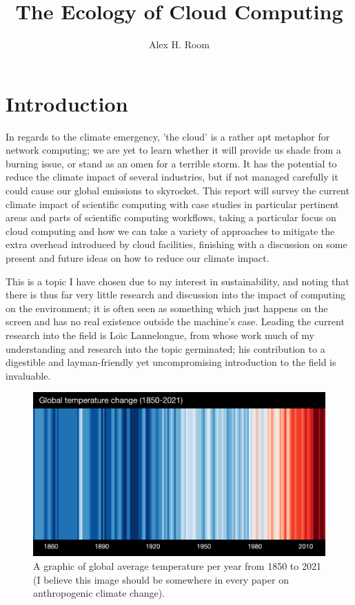 \documentclass{article}
\title{The Ecology of Cloud Computing}
\author{Alex H. Room}
\begin{document}
\maketitle



\section{Introduction}

In regards to the climate emergency, 'the cloud' is a rather apt metaphor for network computing; we are yet to learn whether it will provide us shade from a burning issue, or stand as an omen for a terrible storm. It has the potential to reduce the climate impact of several industries, but if not managed carefully it could cause our global emissions to skyrocket. This report will survey the current climate impact of scientific computing with case studies in particular pertinent areas and parts of scientific computing workflows, taking a particular focus on cloud computing and how we can take a variety of approaches to mitigate the extra overhead introduced by cloud facilities, finishing with a discussion on some present and future ideas on how to reduce our climate impact. \newline

This is a topic I have chosen due to my interest in sustainability, and noting that there is thus far very little research and discussion into the impact of computing on the environment; it is often seen as something which just happens on the screen and has no real existence outside the machine's case. Leading the current research into the field is Lo{\"\i}c Lannelongue, from whose work much of my understanding and research into the topic germinated; his contribution to a digestible and layman-friendly yet uncompromising introduction to the field is invaluable.

\begin{figure}[!ht]
\begin{center}
    \includegraphics[width=.6\textwidth]{Diagrams/GLOBE---1850-2021-MO-withlabels.png}
        \caption{A graphic of global average temperature per year from 1850 to 2021 (I believe this image should be somewhere in every paper on anthropogenic climate change). \citep{hawkins2021show}}
\end{center}
\end{figure}
\end{document}
